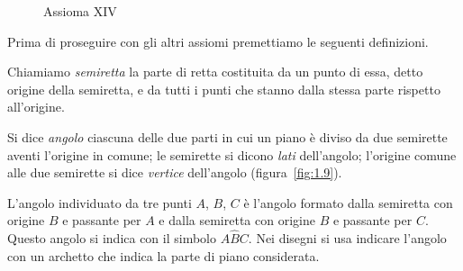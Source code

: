 \begin{inaccessibleblock}
 \begin{figure}[htb]
 \begin{minipage}[b]{.5\textwidth}
 \centering
 
 \caption{Assioma XII}\label{fig:1.7}
 \end{minipage}
 \begin{minipage}[b]{.5\textwidth}
 \centering
 
 \caption{Assioma XIV}\label{fig:1.8}
 \end{minipage}
\end{figure}
\end{inaccessibleblock}

Prima di proseguire con gli altri assiomi premettiamo le seguenti 
definizioni.
\begin{definizione}
Chiamiamo \emph{semiretta} la parte di retta costituita da un punto 
di essa, detto origine della semiretta, e da tutti i punti che stanno 
dalla stessa parte rispetto all'origine.
\end{definizione}

\begin{center}
 
\end{center}

\begin{definizione}
Si dice \emph{angolo} ciascuna delle due parti in cui un piano è 
diviso da due semirette aventi l'origine in comune; le semirette si 
dicono \emph{lati} dell'angolo; l'origine comune alle due semirette 
si dice \emph{vertice} dell'angolo (figura~\ref{fig:1.9}).
\end{definizione}
\begin{figure*}[bth]
\centering  
\caption{Le semirette $r$ e $s$, aventi l'origine $V$ comune, 
individuano due regioni del piano ognuna delle quali è detta 
\emph{angolo}.}\label{fig:1.9}
\end{figure*}

L'angolo individuato da tre punti $A$, $B$, $C$ è l'angolo formato 
dalla semiretta con origine $B$ e passante per $A$ e dalla semiretta 
con origine $B$ e passante per $C$. Questo angolo si indica con il 
simbolo $A\widehat{B}C$. Nei disegni si usa indicare l'angolo con un 
archetto che indica la parte di piano considerata.

